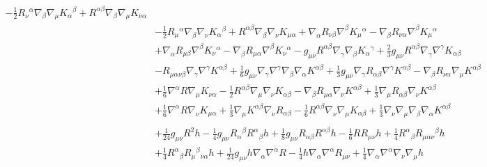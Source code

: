 \documentclass[10pt,letterpaper]{article}
\begin{document}
\begin{align}
 -  \tfrac{1}{2} R_{\nu}{}^{\alpha} \nabla_{\beta}\nabla_{\mu}K_{\alpha}{}^{\beta}
 + R^{\alpha \beta} \nabla_{\beta}\nabla_{\mu}K_{\nu \alpha}\nonumber\\
& -  \tfrac{1}{2} R_{\mu}{}^{\alpha} \nabla_{\beta}\nabla_{\nu}K_{\alpha}{}^{\beta}
 + R^{\alpha \beta} \nabla_{\beta}\nabla_{\nu}K_{\mu \alpha}
 + \nabla_{\alpha}R_{\nu \beta} \nabla^{\beta}K_{\mu}{}^{\alpha}
 -  \nabla_{\beta}R_{\nu \alpha} \nabla^{\beta}K_{\mu}{}^{\alpha}\nonumber\\
& + \nabla_{\alpha}R_{\mu \beta} \nabla^{\beta}K_{\nu}{}^{\alpha}
 -  \nabla_{\beta}R_{\mu \alpha} \nabla^{\beta}K_{\nu}{}^{\alpha}
 -  g_{\mu \nu} R^{\alpha \beta} \nabla_{\gamma}\nabla_{\beta}K_{\alpha}{}^{\gamma}
 + \tfrac{2}{3} g_{\mu \nu} R^{\alpha \beta} \nabla_{\gamma}\nabla^{\gamma}K_{\alpha \beta}\nonumber\\
& -  R_{\mu \alpha \nu \beta} \nabla_{\gamma}\nabla^{\gamma}K^{\alpha \beta}
 + \tfrac{1}{6} g_{\mu \nu} \nabla_{\gamma}\nabla^{\gamma}\nabla_{\beta}\nabla_{\alpha}K^{\alpha \beta}
 + \tfrac{1}{3} g_{\mu \nu} \nabla_{\gamma}R_{\alpha \beta} \nabla^{\gamma}K^{\alpha \beta}
 -  \nabla_{\beta}R_{\nu \alpha} \nabla_{\mu}K^{\alpha \beta}\nonumber\\
& + \tfrac{1}{6} \nabla^{\alpha}R \nabla_{\mu}K_{\nu \alpha}
 -  \tfrac{1}{2} R^{\alpha \beta} \nabla_{\mu}\nabla_{\nu}K_{\alpha \beta}
 -  \nabla_{\beta}R_{\mu \alpha} \nabla_{\nu}K^{\alpha \beta}
 + \tfrac{1}{3} \nabla_{\mu}R_{\alpha \beta} \nabla_{\nu}K^{\alpha \beta}\nonumber\\
& + \tfrac{1}{6} \nabla^{\alpha}R \nabla_{\nu}K_{\mu \alpha}
 + \tfrac{1}{3} \nabla_{\mu}K^{\alpha \beta} \nabla_{\nu}R_{\alpha \beta}
 -  \tfrac{1}{6} R^{\alpha \beta} \nabla_{\nu}\nabla_{\mu}K_{\alpha \beta}
 + \tfrac{1}{3} \nabla_{\nu}\nabla_{\mu}\nabla_{\beta}\nabla_{\alpha}K^{\alpha \beta}\nonumber \\
\nonumber \\
&+\tfrac{1}{24} g_{\mu \nu} R^2 h
 -  \tfrac{1}{4} g_{\mu \nu} R_{\alpha}{}^{\beta} R^{\alpha}{}_{\beta} h
 + \tfrac{1}{8} g_{\mu \nu} R_{\alpha \beta} R^{\alpha \beta} h
 -  \tfrac{1}{6} R R_{\mu \nu} h
 + \tfrac{1}{4} R^{\alpha}{}_{\beta} R_{\mu \alpha \nu}{}^{\beta} h\nonumber\\
& + \tfrac{1}{4} R^{\alpha}{}_{\beta} R_{\mu}{}^{\beta}{}_{\nu \alpha} h
 + \tfrac{1}{24} g_{\mu \nu} h \nabla_{\alpha}\nabla^{\alpha}R
 -  \tfrac{1}{4} h \nabla_{\alpha}\nabla^{\alpha}R_{\mu \nu}
 + \tfrac{1}{4} \nabla_{\alpha}\nabla^{\alpha}\nabla_{\nu}\nabla_{\mu}h\nonumber\\

\end{align}
\end{document}
